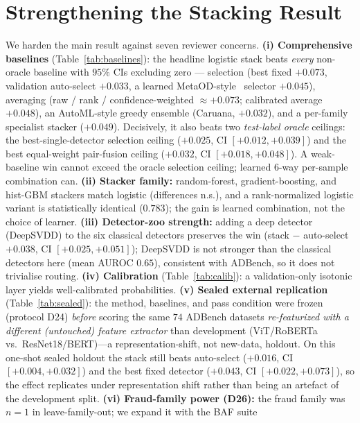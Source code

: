 \documentclass[10pt,conference]{IEEEtran}
\begin{document}


\section{Strengthening the Stacking Result}
\label{sec:strength}
We harden the main result against seven reviewer concerns.
\textbf{(i) Comprehensive baselines} (Table~\ref{tab:baselines}): the headline
logistic stack beats \emph{every} non-oracle baseline with $95\%$ CIs excluding zero
--- selection (best fixed $+0.073$, validation auto-select $+0.033$, a learned
MetaOD-style~\cite{metaod} selector $+0.045$), averaging (raw / rank /
confidence-weighted $\approx+0.073$; calibrated average $+0.048$), an AutoML-style
greedy ensemble (Caruana, $+0.032$), and a per-family specialist stacker ($+0.049$).
Decisively, it also beats two \emph{test-label oracle} ceilings: the
best-single-detector selection ceiling ($+0.025$, CI $[+0.012,+0.039]$) and the best
equal-weight pair-fusion ceiling ($+0.032$, CI $[+0.018,+0.048]$). A weak-baseline win
cannot exceed the oracle selection ceiling; learned $6$-way per-sample combination can.
\textbf{(ii) Stacker family:} random-forest, gradient-boosting, and hist-GBM stackers
match logistic (differences n.s.), and a rank-normalized logistic variant is
statistically identical ($0.783$); the gain is learned combination, not the choice of
learner.
\textbf{(iii) Detector-zoo strength:} adding a deep detector (DeepSVDD) to the six
classical detectors preserves the win (stack $-$ auto-select $+0.038$, CI
$[+0.025,+0.051]$); DeepSVDD is not stronger than the classical detectors here
(mean AUROC $0.65$), consistent with ADBench, so it does not trivialise routing.
\textbf{(iv) Calibration} (Table~\ref{tab:calib}): a validation-only isotonic
layer yields well-calibrated probabilities. \textbf{(v) Sealed external
replication} (Table~\ref{tab:sealed}): the method, baselines, and pass condition
were frozen (protocol D24) \emph{before} scoring the same $74$ ADBench datasets
\emph{re-featurized with a different (untouched) feature extractor} than development
(ViT/RoBERTa vs.\ ResNet18/BERT)---a representation-shift, not new-data, holdout. On
this one-shot sealed holdout the stack still beats auto-select
($+0.016$, CI $[+0.004,+0.032]$) and the best fixed detector ($+0.043$, CI
$[+0.022,+0.073]$), so the effect replicates under representation shift rather than
being an artefact of the development split. \textbf{(vi) Fraud-family power (D26):}
the fraud family was $n{=}1$ in leave-family-out; we expand it with the BAF suite
\end{document}
